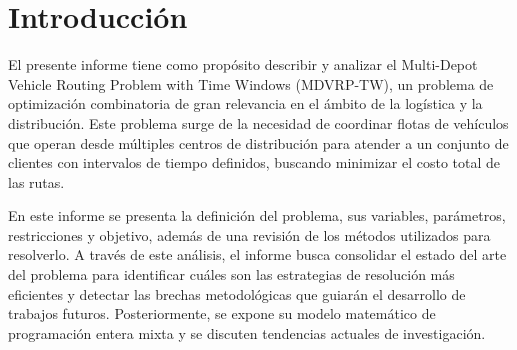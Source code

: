\documentclass[letter, 10pt, dvipdfmx]{article}
\begin{document}
\begin{abstract}
  El Multi-Depot Vehicle Routing Problem with Time Windows (MDVRP-TW) es una variante del
  Vehicle Routing Problem (VRP) que considera múltiples depósitos y restricciones de tiempo para la atención de clientes.
  El objetivo es determinar rutas de mínimo costo para una flota de vehículos que atiende clientes dentro de intervalos de tiempo definidos y retorna a su depósito de origen.
  En este informe se implementa la técnica de Simulated Annealing con el uso de múltiples operadores de vecindad (Swap, Relocate y Split).
  La propuesta fue evaluada usando 5 instancias de 25 hasta 1000 clientes usando 5 semillas aleatorias, demostrando alta robustez con desviaciones del $2,5\%$ y una resolución en un tiempo promedio máximo de 84,05 segundos.
\end{abstract}

\section{Introducción}
El presente informe tiene como propósito describir y analizar el Multi-Depot Vehicle Routing Problem with Time Windows (MDVRP-TW), un problema de optimización combinatoria de
gran relevancia en el ámbito de la logística y la distribución. Este problema surge de la necesidad de coordinar flotas de vehículos que operan desde múltiples centros de
distribución para atender a un conjunto de clientes con intervalos de tiempo definidos, buscando minimizar el costo total de las rutas.

En este informe se presenta la definición del problema, sus variables, parámetros, restricciones y objetivo, además de una revisión de los métodos utilizados para resolverlo.
A través de este análisis, el informe busca consolidar el estado del arte del problema para identificar cuáles son las estrategias de resolución más eficientes y detectar las brechas metodológicas que guiarán el desarrollo de trabajos futuros.
Posteriormente, se expone su modelo matemático de programación entera mixta y se discuten tendencias actuales de investigación.
\end{document}
